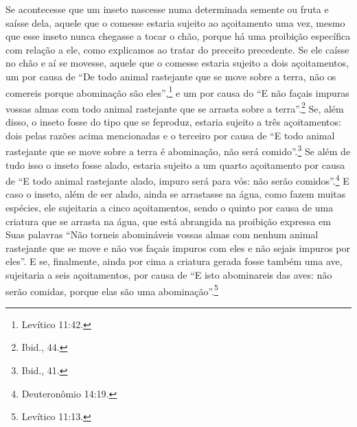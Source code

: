 \begin{multicols}{2}
Se acontecesse que um inseto nascesse numa determinada semente ou fruta
e saísse dela, aquele que o comesse estaria sujeito ao açoitamento uma
vez, mesmo que esse inseto nunca chegasse a tocar o chão, porque há uma
proibição específica com relação a ele, como explicamos ao tratar do
preceito precedente. Se ele caísse no chão e aí se movesse, aquele que
o comesse estaria sujeito a dois açoitamentos, um por causa de ``De todo
animal rastejante que se move sobre a terra, não os comereis porque
abominação são eles'',\footnote{Levítico 11:42.} e um por causa do ``E não façais
impuras vossas almas com todo animal rastejante que se arrasta sobre a
terra''.\footnote{Ibid., 44.} Se, além disso, o inseto fosse do tipo que se
feproduz, estaria sujeito a três açoitamentos: dois pelas razões acima
mencionadas e o terceiro por causa de ``E todo animal rastejante que se
move sobre a terra é abominação, não será comido''.\footnote{Ibid., 41.} Se além
de tudo isso o inseto fosse alado, estaria sujeito a um quarto
açoitamento por causa de ``E todo animal rastejante alado, impuro será
para vós: não serão comidos''.\footnote{Deuteronômio 14:19.} E caso o inseto,
além de ser alado, ainda se arrastasse na água, como fazem muitas
espécies, ele sujeitaria a cinco açoitamentos, sendo o quinto por causa
de uma criatura que se arrasta na água, que está abrangida na proibição
expressa em Suas palavras ``Não torneis abomináveis vossas almas com
nenhum animal rastejante que se move e não vos façais impuros com eles e
não sejais impuros por eles''. E se, finalmente, ainda por cima a
criatura gerada fosse também uma ave, sujeitaria a seis açoitamentos,
por causa de ``E isto abominareis das aves: não serão comidas, porque
elas são uma abominação''.\footnote{Levítico 11:13.}


\end{multicols}
